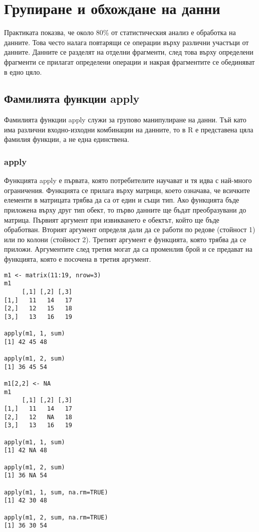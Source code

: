 ﻿\newpage
\chapter{Групиране и обхождане на данни}
\label{chapter06}
\thispagestyle{empty}

Практиката показва, че около 80\% от статистическия анализ е обработка на данните. Това често налага повтарящи се операции върху различни участъци от данните. Данните се разделят на отделни фрагменти, след това върху определени фрагменти се прилагат определени операции и накрая фрагментите се обединяват в едно цяло.

\section{Фамилията функции apply}

Фамилията функции apply служи за групово манипулиране на данни. Тъй като има различни входно-изходни комбинации на данните, то в R е представена цяла фамилия функции, а не една единствена.

\subsection{apply}

Функцията apply е първата, която потребителите научават и тя идва с най-много ограничения. Функцията се прилага върху матрици, което означава, че всичките елементи в матрицата трябва да са от един и същи тип. Ако функцията бъде приложена върху друг тип обект, то първо данните ще бъдат преобразувани до матрица. Първият аргумент при извикването е обектът, който ще бъде обработван. Вторият аргумент определя дали да се работи по редове (стойност 1) или по колони (стойност 2). Третият аргумент е функцията, която трябва да се приложи. Аргументите след третия могат да са променлив брой и се предават на функцията, която е посочена в третия аргумент.

\begin{lstlisting}[caption=Сума по редове и колони, label=listing0093]
m1 <- matrix(11:19, nrow=3)
m1
     [,1] [,2] [,3]
[1,]   11   14   17
[2,]   12   15   18
[3,]   13   16   19
 
apply(m1, 1, sum)
[1] 42 45 48
 
apply(m1, 2, sum)
[1] 36 45 54

m1[2,2] <- NA
m1
     [,1] [,2] [,3]
[1,]   11   14   17
[2,]   12   NA   18
[3,]   13   16   19

apply(m1, 1, sum)
[1] 42 NA 48

apply(m1, 2, sum)
[1] 36 NA 54

apply(m1, 1, sum, na.rm=TRUE)
[1] 42 30 48

apply(m1, 2, sum, na.rm=TRUE)
[1] 36 30 54
\end{lstlisting}

